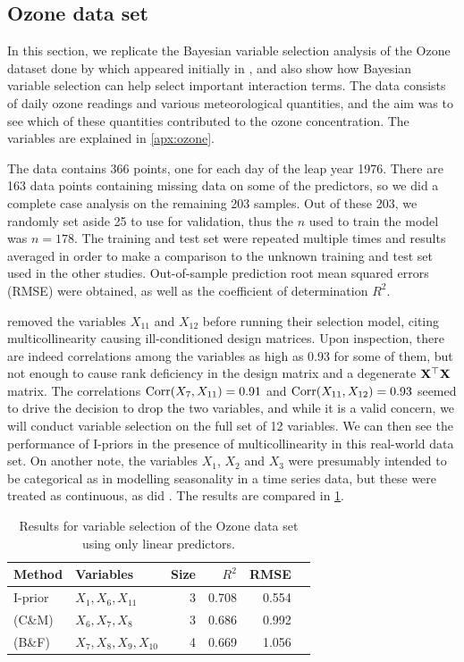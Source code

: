 \documentclass[a4paper,showframe,11pt]{report}
\begin{document}
\subsection{Ozone data set}
\label{sec:ozone}

In this section, we replicate the Bayesian variable selection analysis of the Ozone dataset done by \citet{Casella2006} which appeared initially in \citet{Breiman1985}, and also show how Bayesian variable selection can help select important interaction terms. 
The data consists of daily ozone readings and various meteorological quantities, and the aim was to see which of these quantities contributed to the ozone concentration. 
The variables are explained in \cref{apx:ozone}. 

The data contains 366 points, one for each day of the leap year 1976. 
There are 163 data points containing missing data on some of the predictors, so we did a complete case analysis on the remaining 203 samples. 
Out of these 203, we randomly set aside 25 to use for validation, thus the $n$ used to train the model was $n=178$. 
The training and test set were repeated multiple times and results averaged in order to make a comparison to the unknown training and test set used in the other studies.
Out-of-sample prediction root mean squared errors (RMSE) were obtained, as well as the coefficient of determination $R^2$.

\citeauthor{Casella2006} removed the variables $X_{11}$ and $X_{12}$ before running their selection model, citing multicollinearity causing ill-conditioned design matrices. 
Upon inspection, there are indeed correlations among the variables as high as 0.93 for some of them, but not enough to cause rank deficiency in the design matrix and a degenerate $\mathbf X^\top \mathbf X$ matrix.
The correlations $\operatorname{Corr}(X_7,X_{11}) =0.91$ and $\operatorname{Corr}(X_{11},X_{12}) = 0.93$ seemed to drive the decision to drop the two variables, and while it is a valid concern, we will conduct variable selection on the full set of 12 variables.
We can then see the performance of I-priors in the presence of multicollinearity in this real-world data set. 
On another note, the variables $X_1$, $X_2$ and $X_3$ were presumably intended to be categorical as in modelling seasonality in a time series data, but these were treated as continuous, as did \citeauthor{Casella2006}. 
The results are compared in \cref{tab:ozoneres}.

\begin{table}[htb]
\centering
\caption{Results for variable selection of the Ozone data set using only linear predictors.}
\label{tab:ozoneres}
\begin{tabular}{llrrrr}
\toprule
Method                          &Variables            &Size &$R^2$ &RMSE \\
\midrule
I-prior                         &$X_1,X_6,X_{11}$     &3    &0.708 &0.554 \\
\citeauthor{Casella2006} (C\&M) &$X_6,X_7,X_8$        &3    &0.686 &0.992 \\
\citeauthor{Breiman1985} (B\&F) &$X_7,X_8,X_9,X_{10}$ &4    &0.669 &1.056 \\
\bottomrule
\end{tabular}
\end{table}
\end{document}
